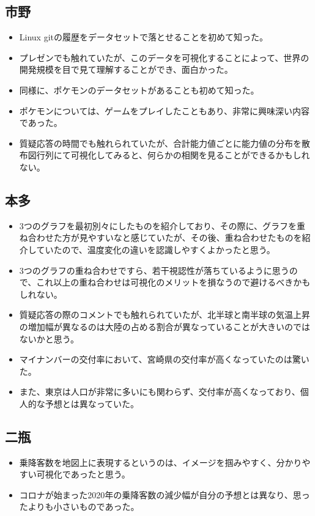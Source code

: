 \documentclass{jsarticle}
\begin{document}
\subsection*{市野}
\begin{itemize}
    \item Linux gitの履歴をデータセットで落とせることを初めて知った。
    \item プレゼンでも触れていたが、このデータを可視化することによって、世界の開発規模を目で見て理解することができ、面白かった。
    \item 同様に、ポケモンのデータセットがあることも初めて知った。
    \item ポケモンについては、ゲームをプレイしたこともあり、非常に興味深い内容であった。
    \item 質疑応答の時間でも触れられていたが、合計能力値ごとに能力値の分布を散布図行列にて可視化してみると、何らかの相関を見ることができるかもしれない。
\end{itemize}
\subsection*{本多}
\begin{itemize}
    \item 3つのグラフを最初別々にしたものを紹介しており、その際に、グラフを重ね合わせた方が見やすいなと感じていたが、その後、重ね合わせたものを紹介していたので、温度変化の違いを認識しやすくよかったと思う。
    \item 3つのグラフの重ね合わせですら、若干視認性が落ちているように思うので、これ以上の重ね合わせは可視化のメリットを損なうので避けるべきかもしれない。
    \item 質疑応答の際のコメントでも触れられていたが、北半球と南半球の気温上昇の増加幅が異なるのは大陸の占める割合が異なっていることが大きいのではないかと思う。
    \item マイナンバーの交付率において、宮崎県の交付率が高くなっていたのは驚いた。
    \item また、東京は人口が非常に多いにも関わらず、交付率が高くなっており、個人的な予想とは異なっていた。
\end{itemize}
\subsection*{二瓶}
\begin{itemize}
    \item 乗降客数を地図上に表現するというのは、イメージを掴みやすく、分かりやすい可視化であったと思う。
    \item コロナが始まった2020年の乗降客数の減少幅が自分の予想とは異なり、思ったよりも小さいものであった。
\end{itemize}
\end{document}
